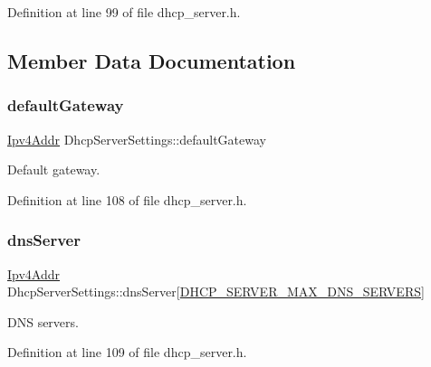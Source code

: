 Definition at line 99 of file dhcp\+\_\+server.\+h.



\subsection{Member Data Documentation}
\mbox{\label{structDhcpServerSettings_ad4b4b4460d2115ea068e05efd78042e1}} 
\subsubsection{\texorpdfstring{default\+Gateway}{defaultGateway}}
{\footnotesize\ttfamily \hyperlink{ipv4_8h_a411debb3d770caa0c06d3f73367da37f}{Ipv4\+Addr} Dhcp\+Server\+Settings\+::default\+Gateway}



Default gateway. 



Definition at line 108 of file dhcp\+\_\+server.\+h.

\mbox{\label{structDhcpServerSettings_af77ddb04fecfd94fe7c1259003b18d76}} 
\subsubsection{\texorpdfstring{dns\+Server}{dnsServer}}
{\footnotesize\ttfamily \hyperlink{ipv4_8h_a411debb3d770caa0c06d3f73367da37f}{Ipv4\+Addr} Dhcp\+Server\+Settings\+::dns\+Server\mbox{[}\hyperlink{dhcp__server_8h_aa9e4ab9acf963783ab2e3901b9fe2c45}{D\+H\+C\+P\+\_\+\+S\+E\+R\+V\+E\+R\+\_\+\+M\+A\+X\+\_\+\+D\+N\+S\+\_\+\+S\+E\+R\+V\+E\+RS}\mbox{]}}



D\+NS servers. 



Definition at line 109 of file dhcp\+\_\+server.\+h.

\mbox{\label{structDhcpServerSettings_a3acdee6074b02512c0abca577e062b26}} 
